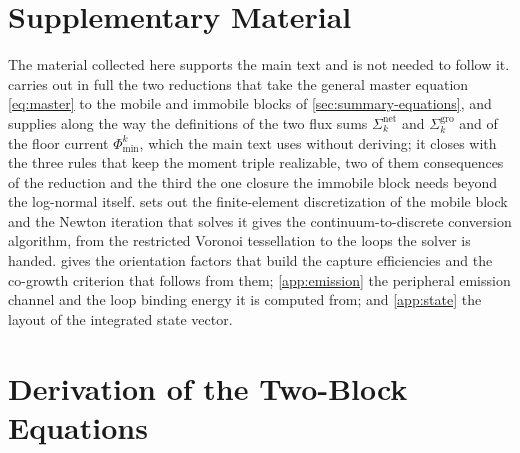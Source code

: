 %
\clearpage
\section*{Supplementary Material}

The material collected here supports the main text and is not needed to follow
it.  carries out in full the two reductions that take the
general master equation \cref{eq:master} to the mobile and immobile blocks of
\cref{sec:summary-equations}, and supplies along the way the definitions of the
two flux sums $\Sigma^{\mathrm{net}}_k$ and $\Sigma^{\mathrm{gro}}_k$ and of the
floor current $\Phi^k_{\min}$, which the main text uses without deriving; it
closes with the three rules that keep the moment triple realizable, two of them
consequences of the reduction and the third the one closure the immobile block
needs beyond the log-normal itself.  sets out the finite-element
discretization of the mobile block and the Newton iteration that solves it
 gives the continuum-to-discrete conversion algorithm,
from the restricted Voronoi tessellation to the loops the solver is handed.
 gives the orientation factors
that build the capture efficiencies and the co-growth criterion that follows
from them; \cref{app:emission} the peripheral emission channel and the loop
binding energy it is computed from; and \cref{app:state} the layout of the
integrated state vector.

\section{Derivation of the Two-Block Equations}
\label{app:derivation}

